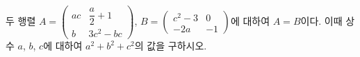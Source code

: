 두 행렬 $A=\begin{pmatrix} ac & \dfrac{a}{2}+1 \\[2mm] b & 3c^2-bc \end{pmatrix}$, $B=\begin{pmatrix} c^2-3 & 0 \\ -2a & -1 \end{pmatrix}$에 대하여 $A=B$이다. 이때 상수 $a$, $b$, $c$에 대하여 $a^2+b^2+c^2$의 값을 구하시오.
